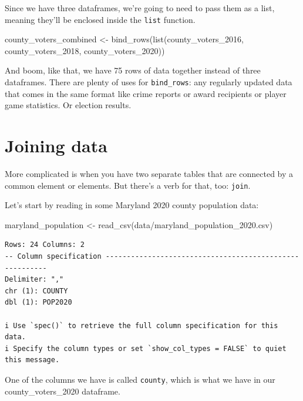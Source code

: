 \documentclass[
  letterpaper,
  DIV=11,
  numbers=noendperiod]{scrreprt}
\newenvironment{Shaded}{\begin{snugshade}}{\end{snugshade}}
\newcommand{\FunctionTok}[1]{\textcolor[rgb]{0.28,0.35,0.67}{#1}}
\newcommand{\NormalTok}[1]{\textcolor[rgb]{0.00,0.23,0.31}{#1}}
\newcommand{\OtherTok}[1]{\textcolor[rgb]{0.00,0.23,0.31}{#1}}
\newcommand{\StringTok}[1]{\textcolor[rgb]{0.13,0.47,0.30}{#1}}
\begin{document}
Since we have three dataframes, we're going to need to pass them as a
list, meaning they'll be enclosed inside the \texttt{list} function.

\begin{Shaded}
\begin{Highlighting}[]
\NormalTok{county\_voters\_combined }\OtherTok{\textless{}{-}} \FunctionTok{bind\_rows}\NormalTok{(}\FunctionTok{list}\NormalTok{(county\_voters\_2016, county\_voters\_2018, county\_voters\_2020))}
\end{Highlighting}
\end{Shaded}

And boom, like that, we have 75 rows of data together instead of three
dataframes. There are plenty of uses for \texttt{bind\_rows}: any
regularly updated data that comes in the same format like crime reports
or award recipients or player game statistics. Or election results.

\hypertarget{joining-data}{%
\section{Joining data}\label{joining-data}}

More complicated is when you have two separate tables that are connected
by a common element or elements. But there's a verb for that, too:
\texttt{join}.

Let's start by reading in some Maryland 2020 county population data:

\begin{Shaded}
\begin{Highlighting}[]
\NormalTok{maryland\_population }\OtherTok{\textless{}{-}} \FunctionTok{read\_csv}\NormalTok{(}\StringTok{\textquotesingle{}data/maryland\_population\_2020.csv\textquotesingle{}}\NormalTok{)}
\end{Highlighting}
\end{Shaded}

\begin{verbatim}
Rows: 24 Columns: 2
-- Column specification --------------------------------------------------------
Delimiter: ","
chr (1): COUNTY
dbl (1): POP2020

i Use `spec()` to retrieve the full column specification for this data.
i Specify the column types or set `show_col_types = FALSE` to quiet this message.
\end{verbatim}

One of the columns we have is called \texttt{county}, which is what we
have in our county\_voters\_2020 dataframe.
\end{document}
